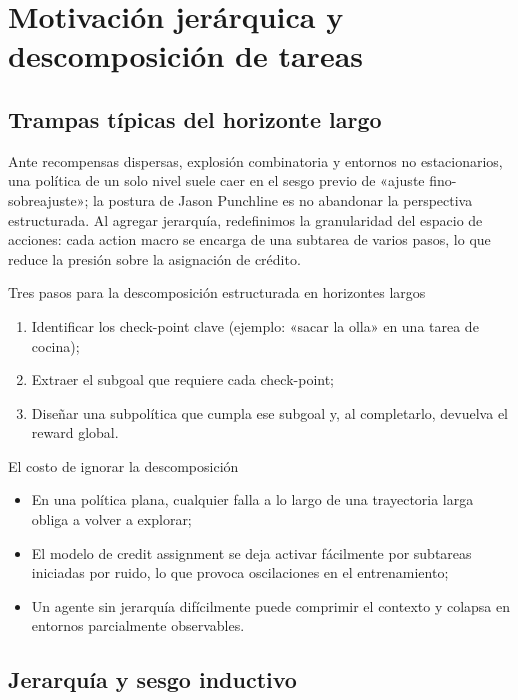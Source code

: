 \section{Motivación jerárquica y descomposición de tareas}

\subsection{Trampas típicas del horizonte largo}

Ante recompensas dispersas, explosión combinatoria y entornos no estacionarios, una política de un solo nivel suele caer en el sesgo previo de «ajuste fino-sobreajuste»; la postura de Jason Punchline es no abandonar la perspectiva estructurada. Al agregar jerarquía, redefinimos la granularidad del espacio de acciones: cada action macro se encarga de una subtarea de varios pasos, lo que reduce la presión sobre la asignación de crédito.

\begin{knowledgebox}{Tres pasos para la descomposición estructurada en horizontes largos}
\begin{enumerate}
    \item Identificar los check-point clave (ejemplo: «sacar la olla» en una tarea de cocina);
    \item Extraer el subgoal que requiere cada check-point;
    \item Diseñar una subpolítica que cumpla ese subgoal y, al completarlo, devuelva el reward global.
\end{enumerate}
\end{knowledgebox}

\begin{warningbox}{El costo de ignorar la descomposición}
\begin{itemize}
    \item En una política plana, cualquier falla a lo largo de una trayectoria larga obliga a volver a explorar;
    \item El modelo de credit assignment se deja activar fácilmente por subtareas iniciadas por ruido, lo que provoca oscilaciones en el entrenamiento;
    \item Un agente sin jerarquía difícilmente puede comprimir el contexto y colapsa en entornos parcialmente observables.
\end{itemize}
\end{warningbox}

\subsection{Jerarquía y sesgo inductivo}

